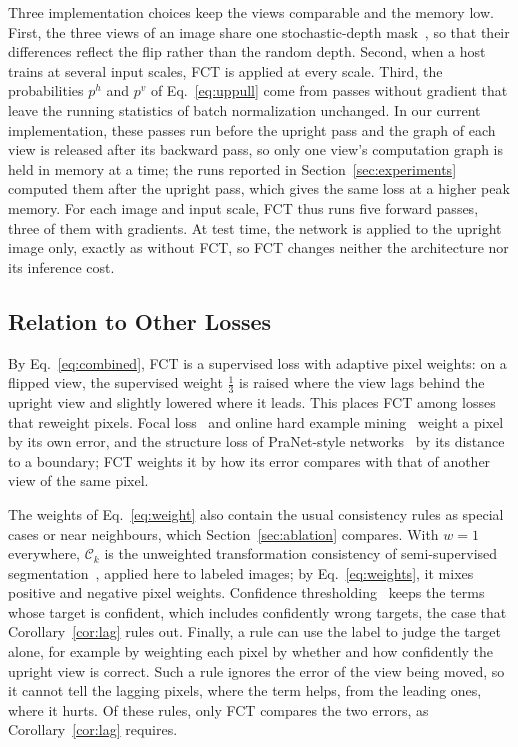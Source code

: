 Three implementation choices keep the views comparable and the memory low. First, the three views of
an image share one stochastic-depth mask~\cite{huang2016stochastic}, so that their differences reflect
the flip rather than the random depth. Second, when a host trains at several input scales, FCT is
applied at every scale. Third, the probabilities $p^{h}$ and $p^{v}$ of Eq.~\eqref{eq:uppull} come from
passes without gradient that leave the running statistics of batch normalization unchanged. In our
current implementation, these passes run before the upright pass and the graph of each view is
released after its backward pass, so only one view's computation graph is held in memory at a time;
the runs reported in Section~\ref{sec:experiments} computed them after the upright pass, which gives
the same loss at a higher peak memory. For each image and input scale, FCT thus runs five forward
passes, three of them with gradients. At test time, the network is applied to the upright image only,
exactly as without FCT, so FCT changes neither the architecture nor its inference cost.

\subsection{Relation to Other Losses}
\label{sec:relation}

By Eq.~\eqref{eq:combined}, FCT is a supervised loss with adaptive pixel weights: on a flipped view,
the supervised weight $\frac13$ is raised where the view lags behind the upright view and slightly
lowered where it leads. This places FCT among losses that reweight pixels. Focal
loss~\cite{lin2017focal} and online hard example mining~\cite{shrivastava2016ohem} weight a pixel by its
own error, and the structure loss of PraNet-style networks~\cite{wei2020f3net} by its distance to a
boundary; FCT weights it by how its error compares with that of another view of the same pixel.

The weights of Eq.~\eqref{eq:weight} also contain the usual consistency rules as special cases or near
neighbours, which Section~\ref{sec:ablation} compares. With $w=1$ everywhere, $\mathcal{C}_k$ is the
unweighted transformation consistency of semi-supervised
segmentation~\cite{bortsova2019consistency,li2021tcsm}, applied here to labeled images; by
Eq.~\eqref{eq:weights}, it mixes positive and negative pixel weights. Confidence
thresholding~\cite{sohn2020fixmatch} keeps the terms whose target is confident, which includes
confidently wrong targets, the case that Corollary~\ref{cor:lag} rules out. Finally, a rule can use the
label to judge the target alone, for example by weighting each pixel by whether and how confidently the
upright view is correct. Such a rule ignores the error of the view being moved, so it cannot tell the
lagging pixels, where the term helps, from the leading ones, where it hurts. Of these rules, only FCT
compares the two errors, as Corollary~\ref{cor:lag} requires.
